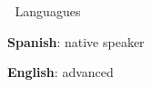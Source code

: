 \begin{cventries}
\cventry
{$\;$}
{Languagues}
{$\;$}
{$\;$}
{
  \begin{cvitems} %
      \item {
          \begin{flushleft}
            \textbf{Spanish}: native speaker
          \end{flushleft}
        }
        \item {
          \begin{flushleft}
            \textbf{English}: advanced
          \end{flushleft}
        }
  \end{cvitems}
}


\end{cventries}
